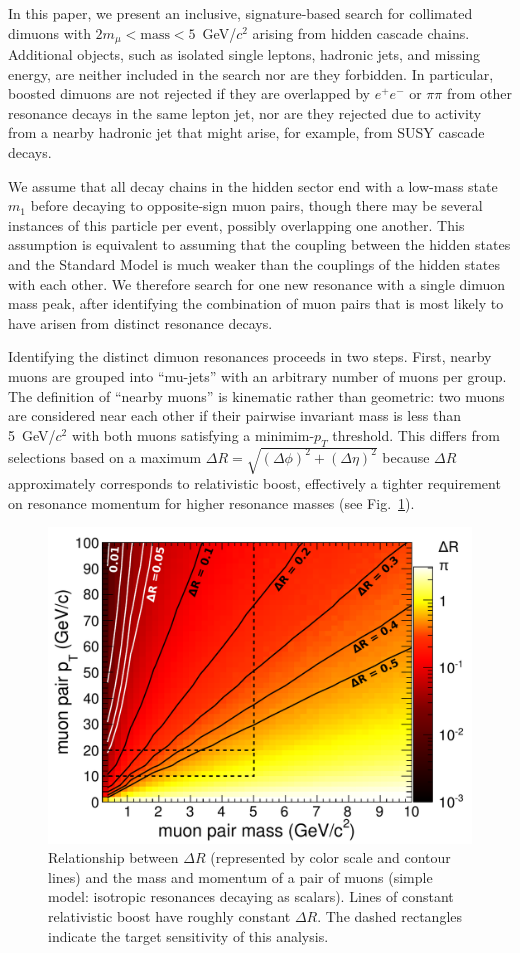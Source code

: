 \documentclass[12pt]{cms-tdr}
\begin{document}
In this paper, we present an inclusive, signature-based search for
collimated dimuons with $2m_\mu < \mbox{mass} < 5$~GeV/$c^2$ arising
from hidden cascade chains.  Additional objects, such as isolated
single leptons, hadronic jets, and missing energy, are neither
included in the search nor are they forbidden.  In particular, boosted
dimuons are not rejected if they are overlapped by $e^+e^-$ or
$\pi\pi$ from other resonance decays in the same lepton jet, nor are
they rejected due to activity from a nearby hadronic jet that might
arise, for example, from SUSY cascade decays.

We assume that all decay chains in the hidden sector end with a
low-mass state $m_1$ before decaying to opposite-sign muon pairs,
though there may be several instances of this particle per event,
possibly overlapping one another.  This assumption is equivalent to
assuming that the coupling between the hidden states and the Standard
Model is much weaker than the couplings of the hidden states with each
other.  We therefore search for one new resonance with a single dimuon
mass peak, after identifying the combination of muon pairs that is
most likely to have arisen from distinct resonance decays.

Identifying the distinct dimuon resonances proceeds in two steps.
First, nearby muons are grouped into ``mu-jets'' with an arbitrary
number of muons per group.  The definition of ``nearby muons'' is
kinematic rather than geometric: two muons are considered near each
other if their pairwise invariant mass is less than 5~GeV/$c^2$ with
both muons satisfying a minimim-$p_T$ threshold.  This differs from
selections based on a maximum $\Delta R = \sqrt{(\Delta \phi)^2 +
  (\Delta \eta)^2}$ because $\Delta R$ approximately corresponds to
relativistic boost, effectively a tighter requirement on resonance
momentum for higher resonance masses (see
Fig.~\ref{fig:openingangle_dr}).

\begin{figure}
\begin{center}
\includegraphics[width=0.6\linewidth]{PLOTS/openingangle_dr.pdf}
\end{center}

\caption{Relationship between $\Delta R$ (represented by color scale
  and contour lines) and the mass and momentum of a pair of muons
  (simple model: isotropic resonances decaying as scalars).  Lines of
  constant relativistic boost have roughly constant $\Delta R$.  The
  dashed rectangles indicate the target sensitivity of this
  analysis. \label{fig:openingangle_dr}}
\end{figure}
\end{document}
